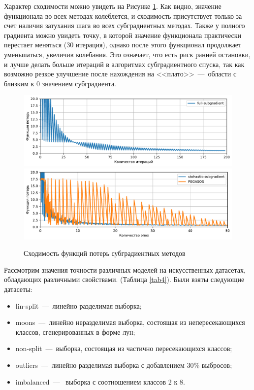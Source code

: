 \documentclass[12pt,fleqn,unicode]{article}
\begin{document}
Характер сходимости можно увидеть на Рисунке \ref{fig1}. Как видно, значение функционала во всех методах
колеблется, и сходимость присутствует только за счет наличия затухания шага во всех субградиентных методах.
Также у полного градиента можно увидеть точку, в которой значение функционала практически перестает меняться
(30 итерация), однако после этого функционал продолжает уменьшаться, увеличив колебания. Это означает, что
есть риск ранней остановки, и лучше делать больше итераций в алгоритмах субградиентного спуска, так как возможно
резкое улучшение после нахождения на <<плато>>~---~области с близким к $0$ значением субградиента.

\begin{figure}[h!]
	\centering
	\caption{Сходимость функций потерь субградиентных методов}
	\label{fig1}
	\includegraphics[width=15cm]{../pict/fs.pdf}
	\includegraphics[width=15cm]{../pict/ss.pdf}
\end{figure}

Рассмотрим значения точности различных моделей на искусственных датасетах, обладающих различными свойствами.
(Таблица \ref{tab4}). Были взяты следующие датасеты:
\begin{itemize}
	\item lin-split~---~линейно разделимая выборка;
	\item moons~---~линейно неразделимая выборка, состоящая из непересекающихся классов, сгенерированных
	в форме лун;
	\item non-split~---~выборка, состоящая из частично пересекающихся классов;
	\item outliers~---~линейно разделимая выборка с добавлением 30\% выбросов;
	\item imbalanced~---~ выборка с соотношением классов 2 к 8.
\end{itemize}
\pagebreak
\end{document}
